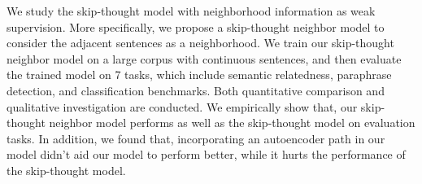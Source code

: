 We study the skip-thought model with neighborhood information as weak supervision. More specifically, we propose a skip-thought neighbor model to consider the adjacent sentences as a neighborhood. We train our skip-thought neighbor model on a large corpus with continuous sentences, and then evaluate the trained model on 7 tasks, which include semantic relatedness, paraphrase detection, and classification benchmarks. Both quantitative comparison and qualitative investigation are conducted. We empirically show that, our skip-thought neighbor model performs as well as the skip-thought model on evaluation tasks. In addition, we found that, incorporating an autoencoder path in our model didn't aid our model to perform better, while it hurts the performance of the skip-thought model.
